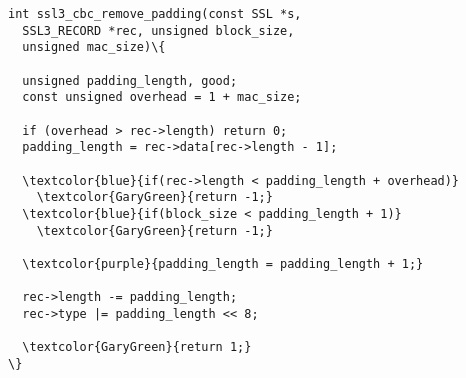 \begin{minipage}[t]{3.1in}
\small
\begin{Verbatim}
int ssl3_cbc_remove_padding(const SSL *s, 
  SSL3_RECORD *rec, unsigned block_size, 
  unsigned mac_size)\{

  unsigned padding_length, good;
  const unsigned overhead = 1 + mac_size;

  if (overhead > rec->length) return 0;
  padding_length = rec->data[rec->length - 1];

  \textcolor{blue}{if(rec->length < padding_length + overhead)}
    \textcolor{GaryGreen}{return -1;}
  \textcolor{blue}{if(block_size < padding_length + 1)}
    \textcolor{GaryGreen}{return -1;}

  \textcolor{purple}{padding_length = padding_length + 1;}

  rec->length -= padding_length;
  rec->type |= padding_length << 8;

  \textcolor{GaryGreen}{return 1;}
\}
\end{Verbatim}
\end{minipage}

